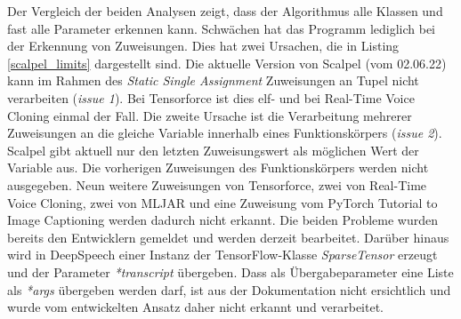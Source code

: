 \documentclass[german,bachelor]{swsLeipzig}
\begin{document}
\noindent Der Vergleich der beiden Analysen zeigt, dass der Algorithmus alle Klassen und fast alle Parameter erkennen kann.
Schwächen hat das Programm lediglich bei der Erkennung von Zuweisungen.
Dies hat zwei Ursachen, die in Listing \ref{scalpel_limits} dargestellt sind.
Die aktuelle Version von Scalpel (vom 02.06.22) kann im Rahmen des \textit{Static Single Assignment} Zuweisungen an Tupel
nicht verarbeiten (\textit{issue 1}).
Bei Tensorforce ist dies elf- und bei Real-Time Voice Cloning einmal der Fall.
Die zweite Ursache ist die Verarbeitung mehrerer Zuweisungen an die gleiche Variable innerhalb eines Funktionskörpers (\textit{issue 2}).
Scalpel gibt aktuell nur den letzten Zuweisungswert als möglichen Wert der Variable aus.
Die vorherigen Zuweisungen des Funktionskörpers werden nicht ausgegeben.
Neun weitere Zuweisungen von Tensorforce, zwei von Real-Time Voice Cloning, zwei von MLJAR und
eine Zuweisung vom PyTorch Tutorial to Image Captioning werden dadurch nicht erkannt.
Die beiden Probleme wurden bereits den Entwicklern gemeldet und werden derzeit bearbeitet.
Darüber hinaus wird in DeepSpeech einer Instanz der TensorFlow-Klasse \textit{SparseTensor} erzeugt und der Parameter \textit{*transcript} übergeben.
Dass als Übergabeparameter eine Liste als \textit{*args} übergeben werden darf, ist aus der Dokumentation nicht ersichtlich
und wurde vom entwickelten Ansatz daher nicht erkannt und verarbeitet.\\
\end{document}
